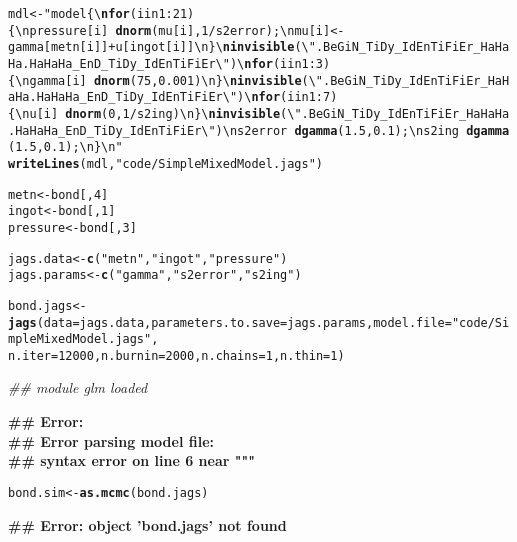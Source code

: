 \documentclass[12pt,letterpaper,oneside]{article}\usepackage{graphicx, color}
\makeatletter
\newcommand{\hlfunctioncall}[1]{\textcolor[rgb]{0.501960784313725,0,0.329411764705882}{\textbf{#1}}}%
\newcommand{\hlstring}[1]{\textcolor[rgb]{0.6,0.6,1}{#1}}%
\newenvironment{kframe}{%
 \def\at@end@of@kframe{}%
 \ifinner\ifhmode%
  \def\at@end@of@kframe{\end{minipage}}%
  \begin{minipage}{\columnwidth}%
 \fi\fi%
 \def\FrameCommand##1{\hskip\@totalleftmargin \hskip-\fboxsep
 \colorbox{shadecolor}{##1}\hskip-\fboxsep
     \hskip-\linewidth \hskip-\@totalleftmargin \hskip\columnwidth}%
 \MakeFramed {\advance\hsize-\width
   \@totalleftmargin\z@ \linewidth\hsize
   \@setminipage}}%
 {\par\unskip\endMakeFramed%
 \at@end@of@kframe}
\newenvironment{knitrout}{}{} %
\makeatother
\begin{document}
\begin{knitrout}\scriptsize
{}\color{fgcolor}\begin{kframe}
\begin{alltt}
mdl <- \hlstring{" model\{\textbackslash{}\hlfunctioncall{nfor} (i in 1:21)\{\textbackslash{}npressure[i] ~ \hlfunctioncall{dnorm}(mu[i], 1/s2error);\textbackslash{}nmu[i] <- gamma[metn[i]] + u[ingot[i]]\textbackslash{}n\}\textbackslash{}\hlfunctioncall{ninvisible}(\textbackslash{}"}.BeGiN_TiDy_IdEnTiFiEr_HaHaHa.HaHaHa_EnD_TiDy_IdEnTiFiEr\textbackslash{}\hlstring{")\textbackslash{}\hlfunctioncall{nfor} (i in 1:3) \{\textbackslash{}ngamma[i] ~ \hlfunctioncall{dnorm}(75, 0.001)\textbackslash{}n\}\textbackslash{}\hlfunctioncall{ninvisible}(\textbackslash{}"}.BeGiN_TiDy_IdEnTiFiEr_HaHaHa.HaHaHa_EnD_TiDy_IdEnTiFiEr\textbackslash{}\hlstring{")\textbackslash{}\hlfunctioncall{nfor} (i in 1:7) \{\textbackslash{}nu[i] ~ \hlfunctioncall{dnorm}(0, 1/s2ing)\textbackslash{}n\}\textbackslash{}\hlfunctioncall{ninvisible}(\textbackslash{}"}.BeGiN_TiDy_IdEnTiFiEr_HaHaHa.HaHaHa_EnD_TiDy_IdEnTiFiEr\textbackslash{}\hlstring{")\textbackslash{}ns2error ~ \hlfunctioncall{dgamma}(1.5, 0.1);\textbackslash{}ns2ing   ~ \hlfunctioncall{dgamma}(1.5, 0.1);\textbackslash{}n\}\textbackslash{}n"}
\hlfunctioncall{writeLines}(mdl, \hlstring{"code/SimpleMixedModel.jags"})
\end{alltt}
\end{kframe}
\end{knitrout}

\begin{knitrout}\scriptsize
{}\color{fgcolor}\begin{kframe}
\begin{alltt}
metn <- bond[, 4]
ingot <- bond[, 1]
pressure <- bond[, 3]

jags.data <- \hlfunctioncall{c}(\hlstring{"metn"}, \hlstring{"ingot"}, \hlstring{"pressure"})
jags.params <- \hlfunctioncall{c}(\hlstring{"gamma"}, \hlstring{"s2error"}, \hlstring{"s2ing"})

bond.jags <- \hlfunctioncall{jags}(data = jags.data, parameters.to.save = jags.params, model.file = \hlstring{"code/SimpleMixedModel.jags"}, 
    n.iter = 12000, n.burnin = 2000, n.chains = 1, n.thin = 1)
\end{alltt}


{\ttfamily\noindent\itshape\textcolor{messagecolor}{\#\# module glm loaded}}

{\ttfamily\noindent\bfseries\textcolor{errorcolor}{\#\# Error: \\\#\# Error parsing model file:\\\#\# syntax error on line 6 near """}}\begin{alltt}
bond.sim <- \hlfunctioncall{as.mcmc}(bond.jags)
\end{alltt}


{\ttfamily\noindent\bfseries\textcolor{errorcolor}{\#\# Error: object 'bond.jags' not found}}\end{kframe}
\end{knitrout}
\end{document}
